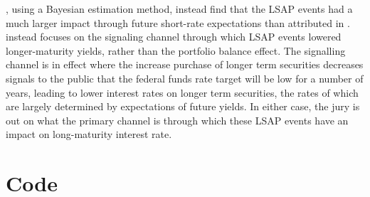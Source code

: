 \documentclass{article}
\numberwithin{equation}{section}
\begin{document}
\citet{bauerrudebusch2011}, using a Bayesian estimation method, instead find
that the LSAP events had a much larger impact through future short-rate
expectations than attributed in \citet{gagnon2010large}.
\citet{bauerrudebusch2011} instead focuses on the signaling channel through
which LSAP events lowered longer-maturity yields, rather than the portfolio
balance effect. The signalling channel is in effect where the increase purchase
of longer term securities decreases signals to the public that the federal
funds rate target will be low for a number of years, leading to lower interest
rates on longer term securities, the rates of which are largely determined by
expectations of future yields. In either case, the jury is out on what the
primary channel is through which these LSAP events have an impact on
long-maturity interest rate.




\section{Code}

%
%
\end{document}
